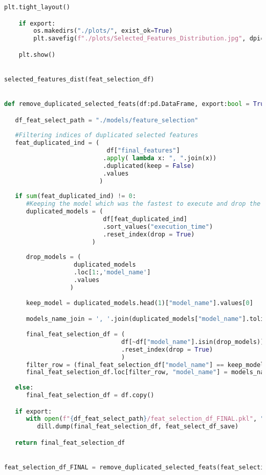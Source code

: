 \begin{lstlisting}[language=Python, basicstyle=\footnotesize\ttfamily]
    plt.tight_layout()

    if export:
        os.makedirs("./plots/", exist_ok=True)
        plt.savefig(f"./plots/Selected_Features_Distribution.jpg", dpi=300)

    plt.show()


selected_features_dist(feat_selection_df)


def remove_duplicated_selected_feats(df:pd.DataFrame, export:bool = True) -> pd.DataFrame:

   df_feat_select_path = "./models/feature_selection"
   
   #Filtering indices of duplicated selected features
   feat_duplicated_ind = (
                            df["final_features"]
                           .apply( lambda x: ", ".join(x))
                           .duplicated(keep = False)
                           .values
                          )
   
   if sum(feat_duplicated_ind) != 0:
      #Keeping the model which was the fastest to execute and drop the others
      duplicated_models = (
                           df[feat_duplicated_ind]
                           .sort_values("execution_time")
                           .reset_index(drop = True)
                        )
    
      drop_models = (
                   duplicated_models
                   .loc[1:,'model_name']
                   .values
                  )
      
      keep_model = duplicated_models.head(1)["model_name"].values[0]

      models_name_join = ', '.join(duplicated_models["model_name"].tolist())
      
      final_feat_selection_df = (
                                df[~df["model_name"].isin(drop_models)]
                                .reset_index(drop = True)
                                )
      filter_row = (final_feat_selection_df["model_name"] == keep_model)
      final_feat_selection_df.loc[filter_row, "model_name"] = models_name_join
      
   else:
      final_feat_selection_df = df.copy()

   if export:
      with open(f"{df_feat_select_path}/feat_selection_df_FINAL.pkl", "wb") as feat_select_df_save:
         dill.dump(final_feat_selection_df, feat_select_df_save)

   return final_feat_selection_df


feat_selection_df_FINAL = remove_duplicated_selected_feats(feat_selection_df)



\end{lstlisting}
